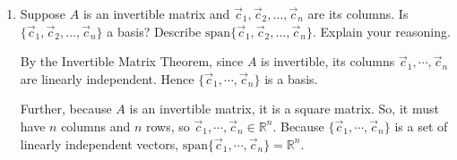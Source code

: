 \documentclass[letter]{article}
\newcommand{\R}{\mathbb{R}}
\newcommand{\Span}{\mathrm{span}}
\newcommand{\Col}{\mathrm{col}}
\newenvironment{answer}{
	\begin{adjustwidth}{8mm}{} \vspace{2mm}}{\end{adjustwidth} \vspace{2mm}
}
\theoremstyle{plain}
\theoremstyle{definition}
\theoremstyle{remark}
\begin{document}
\begin{enumerate}
\begin{enumerate}
\begin{answer}
\begin{itemize}
						Since $V$ has $5$ columns and only $3$ rows, there must be free variables in the equation $V\vec{x} = \vec{v}$. This implies that $V\vec{x} = \vec{v}$ has infinitely many solutions. 
						\item Note that $\Col(B) = \Col(V)$, so $\vec{v} \in \Col(B)$. By the same argument as above, the equation $B\vec{x} = \vec{v}$ has infinitely many solutions. 
					\end{itemize}
				\end{answer}
			\end{enumerate}
		\item Suppose $A$ is an invertible matrix and $\vec c_1,\vec c_2,\ldots,\vec c_n$ are its columns.  Is
			$\{\vec c_1,\vec c_2,\ldots, \vec c_n\}$ a basis?  Describe $\Span\{\vec c_1,\vec c_2,\ldots, \vec c_n\}$.  Explain
			your reasoning.
			\begin{answer}
				By the Invertible Matrix Theorem, since $A$ is invertible, its columns $\vec{c}_1, \cdots, \vec{c}_n$ are linearly independent. Hence $\{\vec{c}_1, \cdots, \vec{c}_n\}$ is a basis. 
				
				Further, because $A$ is an invertible matrix, it is a square matrix. So, it must have $n$ columns and $n$ rows, so $\vec{c}_1, \cdots, \vec{c}_n \in \R^n$. Because $\{\vec{c}_1, \cdots, \vec{c}_n\}$ is a set of linearly independent vectors, $\Span \{\vec{c}_1, \cdots, \vec{c}_n\} = \R^n$. 
			\end{answer}

	\end{enumerate}
\end{document}
